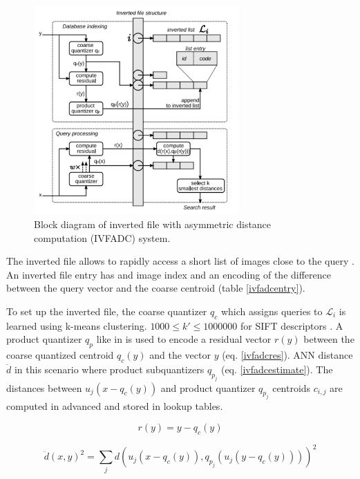 \documentclass[english,12pt,a4paper,pdftex,elec,utf8]{aaltothesis}
\begin{document}
\begin{figure}[htb]
\begin{center}
\includegraphics[height=8cm]{figures/ivfadc}
\end{center}
\caption{Block diagram of inverted file with asymmetric distance computation (IVFADC) system. \cite{Jegou2008}}
\label{ivfadcfig}
\end{figure}

The inverted file allows to rapidly access a short list of images close to the query \cite{Jegou2008}. An inverted file entry has and image index and an encoding of the difference between the query vector and the coarse centroid (table \ref{ivfadcentry}).

To set up the inverted file, the coarse quantizer $q_c$ which assigns queries to $\mathcal{L}_i$ is learned using k-means clustering. $1000 \leq k' \leq 1000000$ for SIFT descriptors \cite{Jegou2008}. A product quantizer $q_p$ like in \cite{Sivic2003} is used to encode a residual vector $r(y)$ between the coarse quantized centroid $q_c(y)$ and the vector $y$ (eq. \ref{ivfadcres}). ANN distance $\ddot{d}$ in this scenario where product subquantizers $q_{p_j}$ (eq. \ref{ivfadcestimate}). The distances between $u_j(x-q_c(y))$
and product quantizer $q_{p_j}$ centroids $c_{i,j}$ are computed in advanced and stored in lookup tables. \cite{Jegou2008}

\begin{equation}
  \label{ivfadcres}
r(y) = y - q_c(y)
\end{equation}

\begin{equation}
  \label{ivfadcestimate}
  \ddot{d}(x,y)^2 = \sum_jd\left(u_j(x-q_c(y)), q_{p_j}(u_j(y-q_c(y)))\right)^2
\end{equation}
\end{document}
